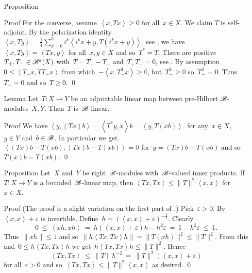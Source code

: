 \documentclass[b]{subfiles}
\begin{document}
\begin{parsec}
\begin{point}{Proposition}
\begin{point}{Proof}
For the converse, assume~$\left<x, Tx\right> \geq 0$
    for all~$x \in X$.
We claim $T$ is self-adjoint.
By the polarization identity
$\left<x, Ty\right>
    = \frac{1}{4} \sum^3_{k=0} i^k \left< i^k x+y, T(i^k x+y)\right>$,
    see ,
    we have~$\left<x,Ty \right> = \left<Tx, y\right>$ for all~$x,y \in X$
    and so~$T^*=T$.
There are positive~$T_+,T_- \in \mathscr{B}^a(X)$
with~$T = T_+ - T_-$ and~$T_+T_- = 0$, see .
By assumption~$0 \leq \left<T_-x,TT_-x\right>$
    from which~$-\left<x,T_-^3x\right> \geq 0$,
    but~$T_-^3 \geq 0$ so~$T_-^3 = 0$.
    Thus~$T_- = 0$ and so~$T \geq 0$. \qed
\end{point}
\end{point}
\begin{point}{Lemma}%
Let~$T\colon X \to Y$
    be an adjointable linear map between pre-Hilbert $\mathscr{B}$-modules~$X,Y$.
Then~$T$ is~$\mathscr{B}$-linear.
\begin{point}{Proof}%
We have
    $\left<y, (Tx)b\right>
    =\left<T^*y, x\right>b
    =\left<y, T(xb)\right>$.
for any~$x \in X$, $y \in Y$ and~$b \in \mathscr{B}$.
In particular we
get~$\left<(Tx)b-T(xb), (Tx)b-T(xb)\right>=0$
for~$y = (Tx)b-T(xb)$
    and so~$T(x)b=T(xb)$. \qed
\end{point}
\end{point}
\begin{point}{Proposition}%
Let~$X$ and~$Y$ be right~$\mathscr{B}$-modules with~$\mathscr{B}$-valued
    inner products.
If~$T \colon X \to Y$ is a bounded~$\mathscr{B}$-linear map,
    then $\left<Tx,Tx\right>\leq \|T\|^2 \left<x,x\right>$
    for~$x \in X$.
\begin{point}{Proof}
(The proof is a slight variation on the first part
of \cite[Thm.~2.8]{paschke}.)
Pick~$\varepsilon > 0$.
By \TODO{}
    $\left<x,x\right> + \varepsilon$ is invertible.
Define~$h = (\left<x,x\right> + \varepsilon)^{-\frac{1}{2}}$.
Clearly
\begin{equation*}
0 \ \leq\  \left<xh,xh\right>
    \ =\  h (\left<x,x\right> + \varepsilon)h - h^2 \varepsilon
    \ =\  1 - h^2 \varepsilon \ \leq\  1.
\end{equation*}
Thus~$\|xh\| \leq 1$
and so~$\|h\left<Tx, Tx\right>h\| = \|T(xh)\|^2 \leq \|T\|^2$.
From this and~$0 \leq h\left<Tx,Tx\right>h$
we get~$h\left<Tx,Tx\right>h \leq \|T\|^2$. Hence
\begin{equation*}
\left<Tx,Tx\right> \ \leq \ \|T\| h^{-2}\  =
    \  \|T\|^2(\left<x,x\right> + \varepsilon)
\end{equation*}
for all~$\varepsilon > 0$
and so~$\left<Tx,Tx\right> \leq \|T\|^2 \left<x,x\right>$ as desired. \qed
\end{point}
\end{point}
\end{parsec}
\end{document}
